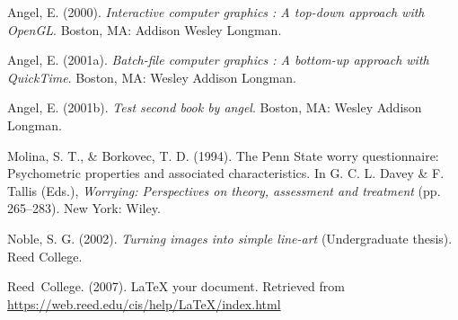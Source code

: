 \documentclass[12pt,twoside]{reedthesis}
\newlength{\cslhangindent}
\newenvironment{CSLReferences}[2] %
 {%
  \setlength{\parindent}{0pt}
  \ifodd #1 \everypar{\setlength{\hangindent}{\cslhangindent}}\ignorespaces\fi
  \ifnum #2 > 0
  \setlength{\parskip}{#2\baselineskip}
  \fi
 }%
 {}
\begin{document}

\noindent

\setlength{\parindent}{-0.20in}

\hypertarget{refs}{}
\begin{CSLReferences}{1}{0}
\leavevmode{}%
Angel, E. (2000). \emph{Interactive computer graphics : A top-down approach with OpenGL}. Boston, MA: Addison Wesley Longman.

\leavevmode{}%
Angel, E. (2001a). \emph{Batch-file computer graphics : A bottom-up approach with QuickTime}. Boston, MA: Wesley Addison Longman.

\leavevmode{}%
Angel, E. (2001b). \emph{Test second book by angel}. Boston, MA: Wesley Addison Longman.

\leavevmode{}%
Molina, S. T., \& Borkovec, T. D. (1994). The {P}enn {S}tate worry questionnaire: Psychometric properties and associated characteristics. In G. C. L. Davey \& F. Tallis (Eds.), \emph{Worrying: Perspectives on theory, assessment and treatment} (pp. 265--283). New York: Wiley.

\leavevmode{}%
Noble, S. G. (2002). \emph{Turning images into simple line-art} (Undergraduate thesis). Reed College.

\leavevmode{}%
Reed~College. (2007). LaTeX your document. Retrieved from \url{https://web.reed.edu/cis/help/LaTeX/index.html}

\end{CSLReferences}

\end{document}

